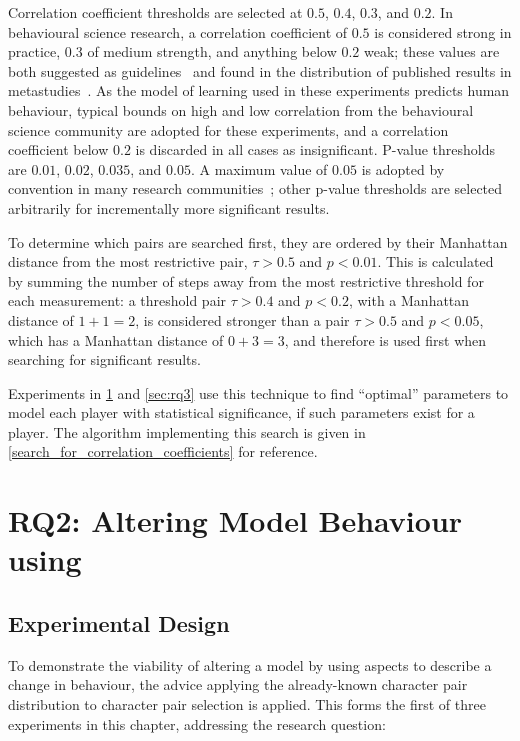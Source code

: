 Correlation coefficient thresholds are selected at $0.5$, $0.4$, $0.3$, and
$0.2$. In behavioural science research, a correlation coefficient of $0.5$ is
considered strong in practice, $0.3$ of medium strength, and anything below
$0.2$ weak; these values are both suggested as
guidelines~\cite{significant_values_for_correlation_statistics} and found in the
distribution of published results in
metastudies~\cite{interpreting_correlation_coefficient_magnitude_psychology}. As
the model of learning used in these experiments predicts human behaviour,
typical bounds on high and low correlation from the behavioural science
community are adopted for these experiments, and a correlation coefficient below
$0.2$ is discarded in all cases as insignificant. P-value thresholds are $0.01$,
$0.02$, $0.035$, and $0.05$. A maximum value of $0.05$ is adopted by convention
in many research communities~\cite{borderline-significance-statistics-medicine};
other p-value thresholds are selected arbitrarily for incrementally more significant
results.

To determine which pairs are searched first, they are ordered by their Manhattan
distance from the most restrictive pair, $\tau{} > 0.5$ and $p < 0.01$. This is
calculated by summing the number of steps away from the most restrictive
threshold for each measurement: a threshold pair $\tau{} > 0.4$ and $p < 0.2$,
with a Manhattan distance of $1 + 1 = 2$, is considered stronger than a pair
$\tau{} > 0.5$ and $p < 0.05$, which has a Manhattan distance of $0 + 3 = 3$,
and therefore is used first when searching for significant results.

Experiments in \cref{sec:rq2} and \cref{sec:rq3} use this technique to find
``optimal'' parameters to model each player with statistical significance, if
such parameters exist for a player. The algorithm implementing this search is
given in \cref{search_for_correlation_coefficients} for reference.



\section{RQ2: Altering Model Behaviour using \AspectOrientation}
\label{sec:rq2}

\subsection{Experimental Design}

To demonstrate the viability of altering a model by using aspects to describe a
change in behaviour, the advice applying the already-known character pair
distribution to character pair selection is applied. This forms the first of
three experiments in this chapter, addressing the research question:

